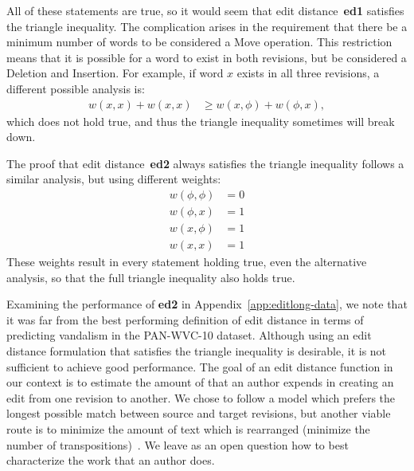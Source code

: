 All of these statements are true, so it would seem that
edit distance~\textbf{ed1} satisfies the triangle inequality.
The complication arises in the requirement
that there be a minimum number of words to be considered a
Move operation.
This restriction means that it is possible for a word to exist
in both revisions, but be considered a Deletion and Insertion.
For example, if word $x$ exists in all three revisions, a different
possible analysis is:
  \begin{align*}
    w(x, x) + w(x, x) & \ge w(x, \phi) + w(\phi, x),
  \end{align*}
which does not hold true, and thus the triangle inequality sometimes
will break down.

\bigskip

The proof that edit distance~\textbf{ed2} always satisfies the
triangle inequality follows a similar analysis, but using different
weights:
\begin{align*}
  w(\phi, \phi) &= 0 \\
  w(\phi, x) &= 1 \\
  w(x, \phi) &= 1 \\
  w(x, x) &= 1
\end{align*}
These weights result in every statement holding true, even the
alternative analysis, so that the
full triangle inequality also holds true.

Examining the performance of \textbf{ed2} in
Appendix~\ref{app:editlong-data}, we note that it was far from the best
performing definition of edit distance in terms of predicting vandalism
in the PAN-WVC-10 dataset.
Although using an edit distance formulation that satisfies the triangle
inequality is desirable, it is not sufficient to achieve good
performance.
The goal of an edit distance function in our context is to estimate
the amount of  that an author expends in creating an
edit from one revision to another.
We chose to follow a model which prefers the longest possible match
between source and target revisions, but another viable route is to
minimize the amount of text which is rearranged (\ie minimize the
number of transpositions)~\cite{Wagner1975}.
We leave as an open question how to best characterize the work
that an author does.

